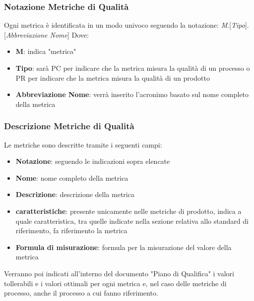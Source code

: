\subsubsection{Notazione Metriche di Qualità}
Ogni metrica è identificata in un modo univoco seguendo la notazione: \textsl{M}.[\textsl{Tipo}].[\textsl{Abbreviazione Nome}]
Dove:
\begin{itemize}
    \item \textbf{M}: indica "metrica"
    \item \textbf{Tipo}: sarà PC per indicare che la metrica misura la qualità di un processo o PR per indicare che la metrica misura la qualità di un prodotto
    \item \textbf{Abbreviazione Nome}: verrà inserito l'acronimo basato sul nome completo della metrica  
\end{itemize}
\subsubsection{Descrizione Metriche di Qualità}
Le metriche sono descritte tramite i seguenti campi:
\begin{itemize}
    \item \textbf{Notazione}: seguendo le indicazioni sopra elencate
    \item \textbf{Nome}: nome completo della metrica 
    \item \textbf{Descrizione}: descrizione della metrica 
    \item \textbf{caratteristiche}: presente unicamente nelle metriche di prodotto, indica a quale caratteristica, tra quelle indicate nella sezione relativa allo standard di riferimento, fa riferimento la metrica
    \item \textbf{Formula di misurazione}: formula per la misurazione del valore della metrica 
\end{itemize}
Verranno poi indicati all'interno del documento "Piano di Qualifica" i valori tollerabili e i valori ottimali per ogni metrica e, nel caso delle metriche di processo, anche il processo a cui fanno riferimento.
